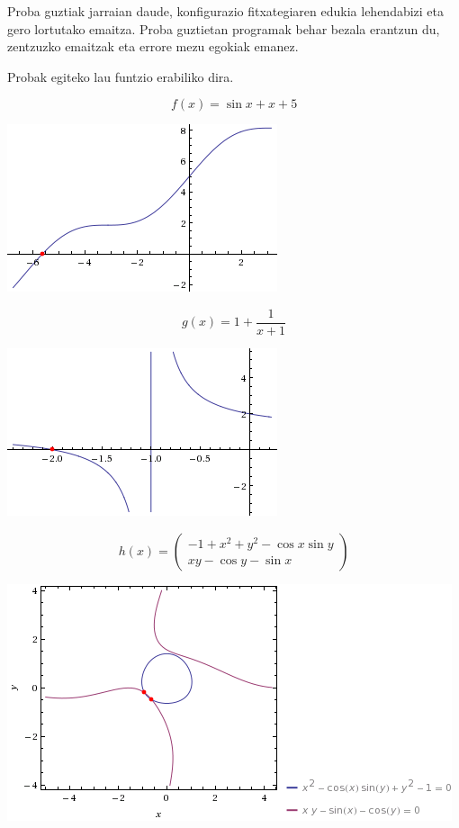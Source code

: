 \documentclass[10pt,a4paper,basque]{article}
\begin{document}
Proba guztiak jarraian daude, konfigurazio fitxategiaren edukia lehendabizi eta gero lortutako emaitza. Proba guztietan programak behar bezala erantzun du, zentzuzko emaitzak eta errore mezu egokiak emanez.

Probak egiteko lau funtzio erabiliko dira.

$$f(x) = \sin{x} + x + 5$$

\begin{center}
\includegraphics[scale=0.5]{plot_fx.png}
\end{center}

$$g(x) = 1 + \frac{1}{x + 1}$$

\begin{center}
\includegraphics[scale=0.5]{plot_gx.png}
\end{center}

$$h(x) = \left(
\begin{array}{c}
-1 + x^2 + y^2 - \cos{x}\sin{y}\\
xy - \cos{y} - \sin{x}
\end{array}
\right)$$

\begin{center}
\includegraphics[scale=0.5]{plot_hx.png}
\end{center}
\end{document}
